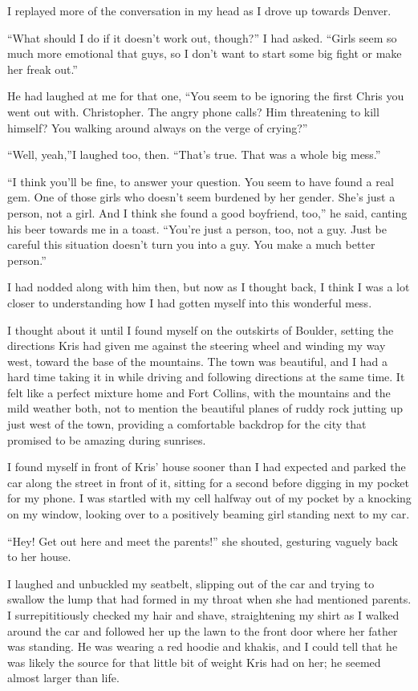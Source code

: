 I replayed more of the conversation in my head as I drove up towards Denver.

``What should I do if it doesn't work out, though?'' I had asked.  ``Girls seem so much more emotional that guys, so I don't want to start some big fight or make her freak out.''

He had laughed at me for that one, ``You seem to be ignoring the first Chris you went out with.  Christopher.  The angry phone calls?  Him threatening to kill himself?  You walking around always on the verge of crying?''

``Well, yeah,''I laughed too, then.  ``That's true.  That was a whole big mess.''

``I think you'll be fine, to answer your question.  You seem to have found a real gem.  One of those girls who doesn't seem burdened by her gender.  She's just a person, not a girl.  And I think she found a good boyfriend, too,'' he said, canting his beer towards me in a toast.  ``You're just a person, too, not a guy.  Just be careful this situation doesn't turn you into a guy.  You make a much better person.''

I had nodded along with him then, but now as I thought back, I think I was a lot closer to understanding how I had gotten myself into this wonderful mess.

I thought about it until I found myself on the outskirts of Boulder, setting the directions Kris had given me against the steering wheel and winding my way west, toward the base of the mountains.  The town was beautiful, and I had a hard time taking it in while driving and following directions at the same time.  It felt like a perfect mixture home and Fort Collins, with the mountains and the mild weather both, not to mention the beautiful planes of ruddy rock jutting up just west of the town, providing a comfortable backdrop for the city that promised to be amazing during sunrises.

I found myself in front of Kris' house sooner than I had expected and parked the car along the street in front of it, sitting for a second before digging in my pocket for my phone.  I was startled with my cell halfway out of my pocket by a knocking on my window, looking over to a positively beaming girl standing next to my car.

``Hey!  Get out here and meet the parents!'' she shouted, gesturing vaguely back to her house.

I laughed and unbuckled my seatbelt, slipping out of the car and trying to swallow the lump that had formed in my throat when she had mentioned parents.  I surrepititiously checked my hair and shave, straightening my shirt as I walked around the car and followed her up the lawn to the front door where her father was standing.  He was wearing a red hoodie and khakis, and I could tell that he was likely the source for that little bit of weight Kris had on her; he seemed almost larger than life.

